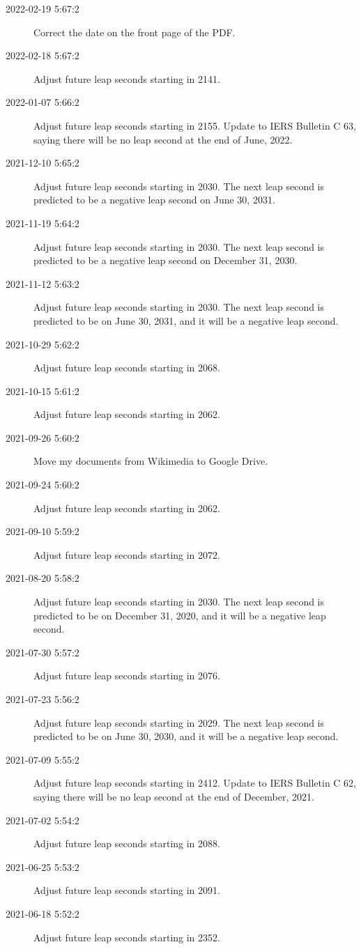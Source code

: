 \documentclass[letterpaper,twoside]{article}
\begin{document}
\begin{description}
\item[2022-02-19 5:67:2]Correct the date on the front page of the PDF.
\item[2022-02-18 5:67:2]Adjust future leap seconds starting in 2141.
\item[2022-01-07 5:66:2]Adjust future leap seconds starting in 2155.
  Update to IERS Bulletin C 63, saying there will be no leap second
  at the end of June, 2022.
\item[2021-12-10 5:65:2]Adjust future leap seconds starting in 2030.
  The next leap second is predicted to be a negative leap second
  on June 30, 2031.
\item[2021-11-19 5:64:2]Adjust future leap seconds starting in 2030.
  The next leap second is predicted to be a negative leap second
  on December 31, 2030.
\item[2021-11-12 5:63:2]Adjust future leap seconds starting in 2030.
  The next leap second is predicted to be on June 30, 2031, and it
  will be a negative leap second.
\item[2021-10-29 5:62:2]Adjust future leap seconds starting in 2068.
\item[2021-10-15 5:61:2]Adjust future leap seconds starting in 2062.
\item[2021-09-26 5:60:2]Move my documents from Wikimedia to Google Drive.
\item[2021-09-24 5:60:2]Adjust future leap seconds starting in 2062.
\item[2021-09-10 5:59:2]Adjust future leap seconds starting in 2072.
\item[2021-08-20 5:58:2]Adjust future leap seconds starting in 2030.
  The next leap second is predicted to be on December 31, 2020, and it
  will be a negative leap second.
\item[2021-07-30 5:57:2]Adjust future leap seconds starting in 2076.
\item[2021-07-23 5:56:2]Adjust future leap seconds starting in 2029.
  The next leap second is predicted to be on June 30, 2030, and it
  will be a negative leap second.
\item[2021-07-09 5:55:2]Adjust future leap seconds starting in 2412.
  Update to IERS Bulletin C 62, saying there will be no leap second
  at the end of December, 2021.
\item[2021-07-02 5:54:2]Adjust future leap seconds starting in 2088.
\item[2021-06-25 5:53:2]Adjust future leap seconds starting in 2091.
\item[2021-06-18 5:52:2]Adjust future leap seconds starting in 2352.

\end{description}
\end{document}
